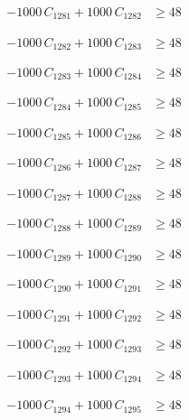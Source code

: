 \documentclass[a4paper,11pt]{article}
\begin{document}
\begin{align}
-1000\,C_{1281} + 1000\,C_{1282} &\geq 48 \nonumber
\end{align}

\begin{align}
-1000\,C_{1282} + 1000\,C_{1283} &\geq 48 \nonumber
\end{align}

\begin{align}
-1000\,C_{1283} + 1000\,C_{1284} &\geq 48 \nonumber
\end{align}

\begin{align}
-1000\,C_{1284} + 1000\,C_{1285} &\geq 48 \nonumber
\end{align}

\begin{align}
-1000\,C_{1285} + 1000\,C_{1286} &\geq 48 \nonumber
\end{align}

\begin{align}
-1000\,C_{1286} + 1000\,C_{1287} &\geq 48 \nonumber
\end{align}

\begin{align}
-1000\,C_{1287} + 1000\,C_{1288} &\geq 48 \nonumber
\end{align}

\begin{align}
-1000\,C_{1288} + 1000\,C_{1289} &\geq 48 \nonumber
\end{align}

\begin{align}
-1000\,C_{1289} + 1000\,C_{1290} &\geq 48 \nonumber
\end{align}

\begin{align}
-1000\,C_{1290} + 1000\,C_{1291} &\geq 48 \nonumber
\end{align}

\begin{align}
-1000\,C_{1291} + 1000\,C_{1292} &\geq 48 \nonumber
\end{align}

\begin{align}
-1000\,C_{1292} + 1000\,C_{1293} &\geq 48 \nonumber
\end{align}

\begin{align}
-1000\,C_{1293} + 1000\,C_{1294} &\geq 48 \nonumber
\end{align}

\begin{align}
-1000\,C_{1294} + 1000\,C_{1295} &\geq 48 \nonumber
\end{align}
\end{document}
